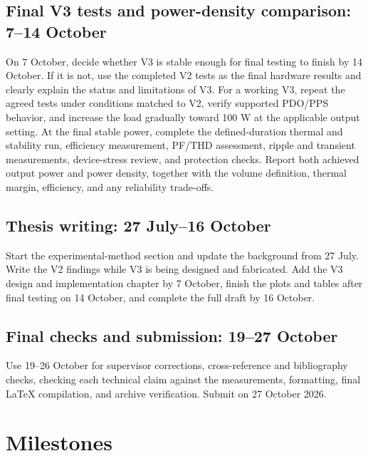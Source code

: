 \documentclass[12pt,a4paper]{report}
\begin{document}
\subsection*{Final V3 tests and power-density comparison: 7--14 October}
    On 7 October, decide whether V3 is stable enough for final testing to finish by 14 October. If it is not, use the completed V2 tests as the final hardware results and clearly explain the status and limitations of V3. For a working V3, repeat the agreed tests under conditions matched to V2, verify supported PDO/PPS behavior, and increase the load gradually toward 100 W at the applicable output setting. At the final stable power, complete the defined-duration thermal and stability run, efficiency measurement, PF/THD assessment, ripple and transient measurements, device-stress review, and protection checks. Report both achieved output power and power density, together with the volume definition, thermal margin, efficiency, and any reliability trade-offs.

\subsection*{Thesis writing: 27 July--16 October}
    Start the experimental-method section and update the background from 27 July. Write the V2 findings while V3 is being designed and fabricated. Add the V3 design and implementation chapter by 7 October, finish the plots and tables after final testing on 14 October, and complete the full draft by 16 October.

\subsection*{Final checks and submission: 19--27 October}
    Use 19--26 October for supervisor corrections, cross-reference and bibliography checks, checking each technical claim against the measurements, formatting, final LaTeX compilation, and archive verification. Submit on 27 October 2026.

\section{Milestones}
\end{document}
